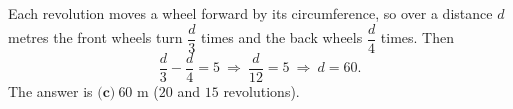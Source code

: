 Each revolution moves a wheel forward by its circumference, so over a distance $d$ metres the front wheels turn $\dfrac {d}{3}$ times and the back wheels $\dfrac {d}{4}$ times. Then
\[
\dfrac {d}{3}-\dfrac {d}{4}=5\ \Longrightarrow\ \dfrac{d}{12}=5\ \Longrightarrow\ d=60 .
\]
The answer is $\boxed{\textbf{(c)}\ 60\text{ m}}$ ($20$ and $15$ revolutions).
